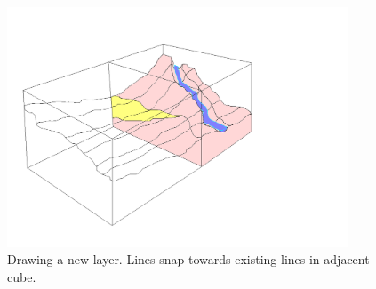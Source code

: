 \documentclass[12pt,a4paper]{article}
\begin{document}
\begin{figure}
\centering
\includegraphics[width=4in]{newCubeLayer}
\caption[]{
  \footnotesize
  Drawing a new layer. Lines snap towards existing lines in adjacent cube.
  \label{fig:newCubeLayer}
}
\end{figure}
\end{document}
